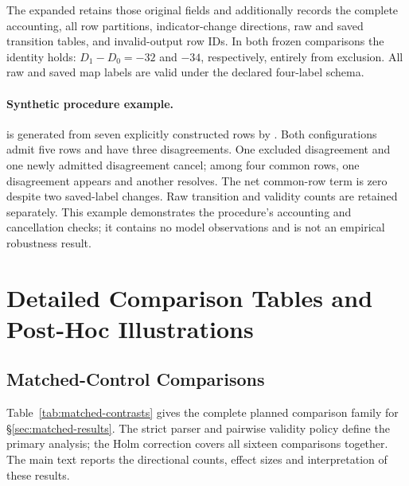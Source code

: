 \documentclass[11pt]{article}
\begin{document}
The expanded  retains those
original fields and additionally records the complete accounting, all row
partitions, indicator-change directions, raw and saved transition tables,
and invalid-output row IDs. In both frozen comparisons the identity holds:
$D_1-D_0=-32$ and $-34$, respectively, entirely from exclusion. All raw and
saved map labels are valid under the declared four-label schema.

\paragraph{Synthetic procedure example.}
 is generated from
seven explicitly constructed rows by .
Both configurations admit five rows and have three disagreements. One
excluded disagreement and one newly admitted disagreement cancel; among four
common rows, one disagreement appears and another resolves. The net
common-row term is zero despite two saved-label changes. Raw transition and
validity counts are retained separately. This example demonstrates the
procedure's accounting and cancellation checks; it contains no model
observations and is not an empirical robustness result.


\clearpage
\section{Detailed Comparison Tables and Post-Hoc Illustrations}
\label{app:comparison-details}

\subsection{Matched-Control Comparisons}
\label{app:matched-comparisons}
Table~\ref{tab:matched-contrasts} gives the complete planned comparison family
for \S\ref{sec:matched-results}. The strict parser and pairwise validity
policy define the primary analysis; the Holm correction covers all sixteen
comparisons together. The main text reports the directional counts, effect
sizes and interpretation of these results.
\end{document}
